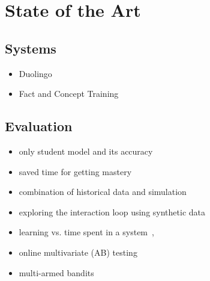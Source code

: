 \documentclass[table,color]{fithesis3/fithesis3}
\begin{document}
\chapter{State of the Art}

\section{Systems}

\begin{itemize}
	\item Duolingo~\cite{von2013duolingo, garcia2013learning}
	\item Fact and Concept Training~\cite{pavlik2007fact,pavlik2008using}
\end{itemize}

\section{Evaluation}

\begin{itemize}
	\item only student model and its accuracy~\cite{pelanek2014brief}
	\item saved time for getting mastery~\cite{yudelson2015small}
	\item combination of historical data and simulation~\cite{gonzalez2015your}
	\item exploring the interaction loop using synthetic data~\cite{niznan2015exploring}
	\item learning vs. time spent in a system~\cite{lomas2013optimizing, monterrat2015player},
	\item online multivariate (AB) testing~\cite{lomas2013optimizing,liu2014towards,stamper2012rise}
	\item multi-armed bandits~\cite{liu2014trading}
\end{itemize}



\end{document}
